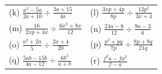 \begin{enumerate}[noitemsep, label=\textbf{\arabic*}. ]
{\begin{tabular}[t]{|l|l|}
        (k) $\frac{{a}^{2}-5a}{2a+10}÷\frac{3a+15}{4a}$\hspace{1ex} &
        (l) $\frac{3xp+4p}{8p}÷\frac{12{p}^{2}}{3x+4}$\hspace{1ex}%
     \tabularnewline\cline{1-1}\cline{2-2}
        (m) $\frac{16}{2xp+4x}÷\frac{6{x}^{2}+8x}{12}$\hspace{1ex} &
        (n) $\frac{24a-8}{12}÷\frac{9a-3}{6}$\hspace{1ex}%
     \tabularnewline\cline{1-1}\cline{2-2}
        (o) $\frac{{a}^{2}+2a}{5}÷\frac{2a+4}{20}$\hspace{1ex} &
        (p) $\frac{{p}^{2}+pq}{7p}÷\frac{8p+8q}{21q}$\hspace{1ex}%
     \tabularnewline\cline{1-1}\cline{2-2}
        (q) $\frac{5ab-15b}{4a-12}÷\frac{6{b}^{2}}{a+b}$\hspace{1ex} &
        (r) $\frac{{f}^{2}a-f{a}^{2}}{f-a}$%

\end{tabular}}
\end{enumerate}
